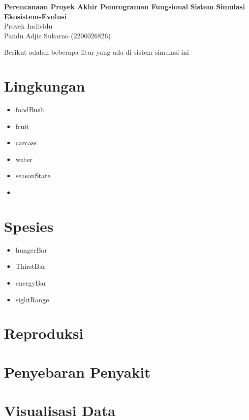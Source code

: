 \documentclass[12pt]{article}
\begin{document}
 
%
\renewcommand{\arraystretch}{1.25}

\begin{center}
    \Large
\textbf{Perencanaan Proyek Akhir Pemrograman Fungsional}
\textbf{Sistem Simulasi Ekosistem-Evolusi}\\
Proyek Individu\\
Pandu Adjie Sukarno (2206026826)
\end{center}
\noindent Berikut adalah beberapa fitur yang ada di sistem simulasi ini
\section{Lingkungan}
\begin{itemize}
    \item foodBush
    \item fruit
    \item carcass
    \item water
    \item seasonState
    \item 
\end{itemize}
\section{Spesies}
\begin{itemize}
    \item hungerBar
    \item ThirstBar
    \item energyBar
    \item sightRange
\end{itemize}
\section{Reproduksi}
\section{Penyebaran Penyakit}
\section{Visualisasi Data}


 
\end{document}
